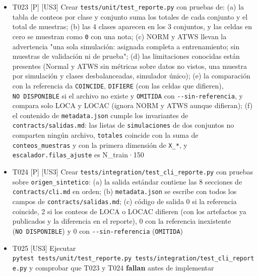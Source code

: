 \documentclass[12pt,a4paper]{article}
\providecommand{\tightlist}{\setlength{\itemsep}{0pt}\setlength{\parskip}{0pt}}
\newenvironment{documentogenerado}[2]{%
  \def\doccomando{#1}\def\docruta{#2}%
  \par\begingroup\small\setstretch{1.15}\sloppy%
}{\endgroup\par\medskip}
\begin{document}
\begin{documentogenerado}{/speckit-tasks (fase 7: /speckit-converge)}{specs\slash 001-preparacion-datos\slash tasks.md}
\begin{itemize}
\tightlist
\item[$\boxtimes$]
  T023 {[}P{]} {[}US3{]} Crear \texttt{tests/\allowbreak{}unit/\allowbreak{}test\_\allowbreak{}reporte.\allowbreak{}py} con pruebas de: (a) la tabla de conteos por clase y conjunto suma los totales de cada conjunto y el total de muestras; (b) las 4 clases aparecen en los 3 conjuntos, y las celdas en cero se muestran como \texttt{0} con una nota; (c) NORM y ATWS llevan la advertencia "una sola simulación: asignada completa a entrenamiento; sin muestras de validación ni de prueba"; (d) las limitaciones conocidas están presentes (Normal y ATWS sin métricas sobre datos no vistos, una muestra por simulación y clases desbalanceadas, simulador único); (e) la comparación con la referencia da \texttt{COINCIDE}, \texttt{DIFIERE} (con las celdas que difieren), \texttt{NO\ DISPONIBLE} si el archivo no existe y \texttt{OMITIDA} con \texttt{-\allowbreak{}\/\allowbreak{}-\allowbreak{}sin-\allowbreak{}referencia}, y compara solo LOCA y LOCAC (ignora NORM y ATWS aunque difieran); (f) el contenido de \texttt{metadata.\allowbreak{}json} cumple los invariantes de \texttt{contracts/\allowbreak{}salidas.\allowbreak{}md}: las listas de \texttt{simulaciones} de dos conjuntos no comparten ningún archivo, \texttt{totales} coincide con la suma de \texttt{conteos\_\allowbreak{}muestras} y con la primera dimensión de \texttt{X\_\allowbreak{}*}, y \texttt{escalador.\allowbreak{}filas\_\allowbreak{}ajuste} es N\_train·150
\item[$\boxtimes$]
  T024 {[}P{]} {[}US3{]} Crear \texttt{tests/\allowbreak{}integration/\allowbreak{}test\_\allowbreak{}cli\_\allowbreak{}reporte.\allowbreak{}py} con pruebas sobre \texttt{origen\_\allowbreak{}sintetico}: (a) la salida estándar contiene las 8 secciones de \texttt{contracts/\allowbreak{}cli.\allowbreak{}md} en orden; (b) \texttt{metadata.\allowbreak{}json} se escribe con todos los campos de \texttt{contracts/\allowbreak{}salidas.\allowbreak{}md}; (c) código de salida 0 si la referencia coincide, 2 si los conteos de LOCA o LOCAC difieren (con los artefactos ya publicados y la diferencia en el reporte), 0 con la referencia inexistente (\texttt{NO\ DISPONIBLE}) y 0 con \texttt{-\allowbreak{}\/\allowbreak{}-\allowbreak{}sin-\allowbreak{}referencia} (\texttt{OMITIDA})
\item[$\boxtimes$]
  T025 {[}US3{]} Ejecutar \texttt{pytest\ tests/\allowbreak{}unit/\allowbreak{}test\_\allowbreak{}reporte.\allowbreak{}py\ tests/\allowbreak{}integration/\allowbreak{}test\_\allowbreak{}cli\_\allowbreak{}reporte.\allowbreak{}py} y comprobar que T023 y T024 \textbf{fallan} antes de implementar
\end{itemize}


\end{documentogenerado}
\end{document}
